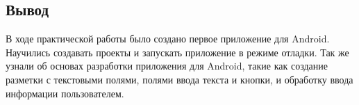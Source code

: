 \newpage

\subsection*{Вывод}
В ходе практической работы было создано первое приложение для Android.
Научились создавать проекты и запускать приложение в режиме отладки.
Так же узнали об основах разработки приложения для Android, такие как
создание разметки с текстовыми полями, полями ввода текста и кнопки,
и обработку ввода информации пользователем.
